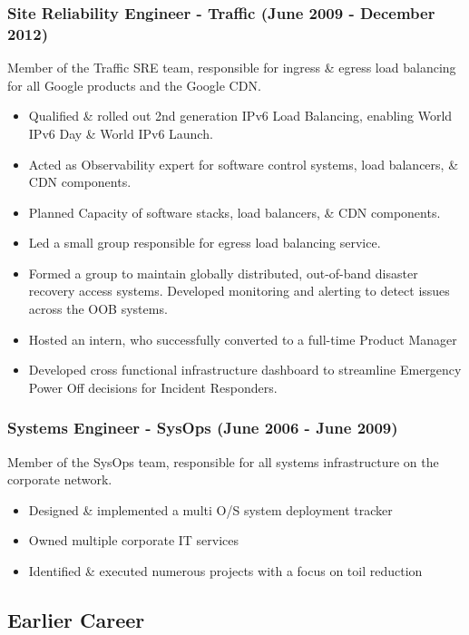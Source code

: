 \documentclass[a4paper, 10pt] {article}
\begin{document}
\subsubsection*{Site Reliability Engineer - Traffic (June 2009 - December 2012)}

Member of the Traffic SRE team, responsible for ingress \& egress load
balancing for all Google products and the Google CDN. 

\begin{itemize}[noitemsep]
  \item Qualified \& rolled out 2nd generation IPv6 Load Balancing, enabling World IPv6 Day \& World IPv6 Launch.
	\item Acted as Observability expert for software control systems, load balancers, \& CDN components.
	\item Planned Capacity of software stacks, load balancers, \& CDN components.
 	\item Led a small group responsible for egress load balancing service.
  	\item Formed a group to maintain globally distributed, out-of-band disaster recovery access systems. Developed monitoring and alerting to
   		detect issues across the OOB systems.
 	\item Hosted an intern, who successfully converted to a full-time Product Manager
	\item Developed cross functional infrastructure dashboard to streamline Emergency Power Off decisions for Incident Responders.
\end{itemize}

\subsubsection*{Systems Engineer - SysOps (June 2006 - June 2009)}

Member of the SysOps team, responsible for all systems infrastructure on
the corporate network.

\begin{itemize}[noitemsep]
	\item Designed \& implemented a multi O/S system deployment tracker
	\item Owned multiple corporate IT services
	\item Identified \& executed numerous projects with a focus on toil reduction
\end{itemize}

\subsection*{Earlier Career}
\end{document}
